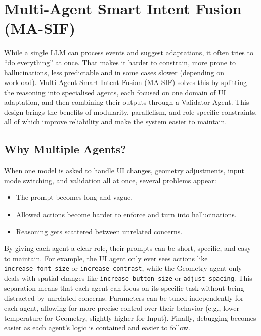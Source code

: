\documentclass[openany]{book}
\begin{document}
\section{Multi-Agent Smart Intent Fusion (MA-SIF)}
While a single LLM can process events and suggest adaptations, it often tries to “do everything” at once.
That makes it harder to constrain, more prone to hallucinations, less predictable and in some cases slower (depending on workload).
Multi-Agent Smart Intent Fusion (MA-SIF) solves this by splitting the reasoning into specialised agents, each focused on one domain of UI adaptation, and then combining their outputs through a Validator Agent.
This design brings the benefits of modularity, parallelism, and role-specific constraints, all of which improve reliability and make the system easier to maintain.

\subsection{Why Multiple Agents?}
When one model is asked to handle UI changes, geometry adjustments, input mode switching, and validation all at once, several problems appear:
\begin{itemize}
    \item The prompt becomes long and vague.
    \item Allowed actions become harder to enforce and turn into hallucinations.
    \item Reasoning gets scattered between unrelated concerns.
\end{itemize}
By giving each agent a clear role, their prompts can be short, specific, and easy to maintain.
For example, the UI agent only ever sees actions like \texttt{increase\_font\_size} or \texttt{increase\_contrast}, while the Geometry agent only deals with spatial changes like \texttt{increase\_button\_size} or \texttt{adjust\_spacing}.
This separation means that each agent can focus on its specific task without being distracted by unrelated concerns. Parameters can be tuned independently for each agent, allowing for more precise control over their behavior (e.g., lower temperature for Geometry, slightly higher for Input). Finally, debugging becomes easier as each agent's logic is contained and easier to follow.
\end{document}
